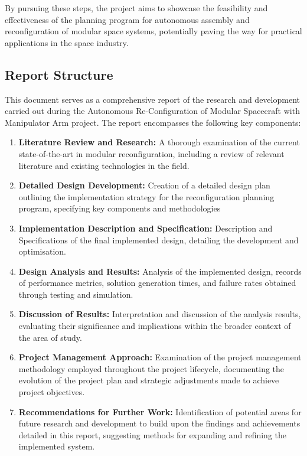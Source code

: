 By pursuing these steps, the project aims to showcase the feasibility and effectiveness of the planning program for autonomous assembly and reconfiguration of modular space systems, potentially paving the way for practical applications in the space industry.

\newpage
\subsection{Report Structure}
This document serves as a comprehensive report of the research and development carried out during the Autonomous Re-Configuration of Modular Spacecraft with Manipulator Arm project. The report encompasses the following key components:
\begin{enumerate}[]
	\item\textbf{Literature Review and Research:} A thorough examination of the current state-of-the-art in modular reconfiguration, including a review of relevant literature and existing technologies in the field.
	\item\textbf{Detailed Design Development:} Creation of a detailed design plan outlining the implementation strategy for the reconfiguration planning program, specifying key components and methodologies
	\item\textbf{Implementation Description and Specification:} Description and Specifications of the final implemented design, detailing the development and optimisation.
	\item\textbf{Design Analysis and Results:} Analysis of the implemented design, records of performance metrics, solution generation times, and failure rates obtained through testing and simulation.
	\item\textbf{Discussion of Results:} Interpretation and discussion of the analysis results, evaluating their significance and implications within the broader context of the area of study.
	\item\textbf{Project Management Approach:} Examination of the project management methodology employed throughout the project lifecycle, documenting the evolution of the project plan and strategic adjustments made to achieve project objectives.
	\item\textbf{Recommendations for Further Work:} Identification of potential areas for future research and development to build upon the findings and achievements detailed in this report, suggesting methods for expanding and refining the implemented system.
	
\end{enumerate}